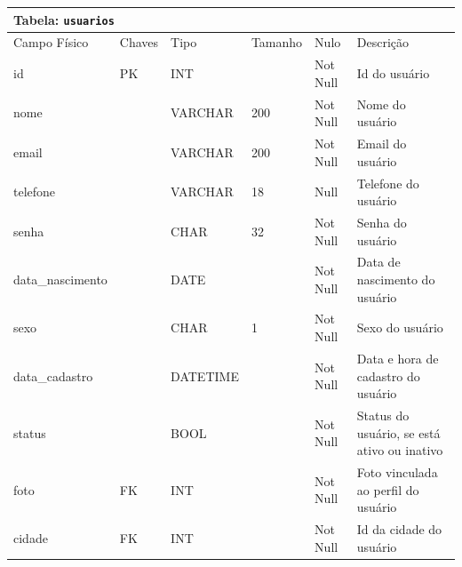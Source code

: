 \documentclass[12pt,a4paper]{article}
\begin{document}
\begin{center}
\begin{table}[h!]
	\label{tabela:exemplo}
	\begin{tabular}{|p{2.3cm}|p{1.2cm}|p{1.8cm}|p{1.5cm}|p{1cm}|p{6cm}|}\hline	
		\multicolumn{6}{|p{16cm}|}{\cellcolor{cinzaClaro}  \centering Tabela: \texttt{usuarios}} \\ \hline %
		{\small Campo Físico}   & {\small Chaves} & {\small Tipo} & {\small Tamanho} & {\small Nulo} & {\small Descrição}\\\hline %
		
		{\tiny id} & {\tiny PK} & {\tiny INT} & {\tiny } & {\tiny Not Null} &{\tiny Id do usuário}\\\hline
		{\tiny nome} & {\tiny } & {\tiny VARCHAR} & {\tiny 200} & {\tiny Not Null} &{\tiny  Nome do usuário}\\\hline
		{\tiny email} & {\tiny } & {\tiny VARCHAR} & {\tiny 200} & {\tiny Not Null} &{\tiny Email do usuário}\\\hline
		{\tiny telefone} & {\tiny } & {\tiny VARCHAR } & {\tiny 18} & {\tiny  Null} &{\tiny Telefone do usuário}\\\hline
		{\tiny senha} & {\tiny } & {\tiny CHAR} & {\tiny 32} & {\tiny Not Null} &{\tiny Senha do usuário}\\\hline
		{\tiny data\_nascimento} & {\tiny } & {\tiny DATE} & {\tiny } & {\tiny Not Null} &{\tiny Data de nascimento do usuário}\\\hline
		{\tiny sexo} & {\tiny } & {\tiny CHAR} & {\tiny 1} & {\tiny Not Null} &{\tiny Sexo do usuário}\\\hline
		{\tiny data\_cadastro} & {\tiny } & {\tiny DATETIME} & {\tiny } & {\tiny Not Null} &{\tiny Data e hora de cadastro do usuário}\\\hline
		{\tiny status} & {\tiny } & {\tiny BOOL} & {\tiny } & {\tiny Not Null} &{\tiny Status do usuário, se está ativo ou inativo}\\\hline		
		{\tiny foto} & {\tiny FK} & {\tiny INT} & {\tiny } & {\tiny Not Null} &{\tiny Foto vinculada ao perfil do usuário}\\\hline
		{\tiny cidade} & {\tiny FK} & {\tiny INT} & {\tiny } & {\tiny Not Null} &{\tiny Id da cidade do usuário}\\\hline
		
			
	\end{tabular}
\end{table}	
\end{center}
\end{document}
